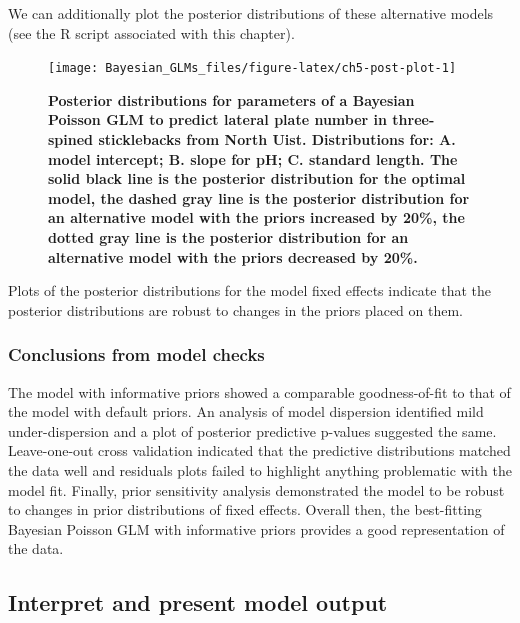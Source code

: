 \documentclass[
]{book}
\begin{document}
We can additionally plot the posterior distributions of these alternative models (see the R script associated with this chapter).



\begin{figure}

{\centering \texttt{[image: Bayesian\_GLMs\_files/figure-latex/ch5-post-plot-1]} 

}

\caption{\textbf{Posterior distributions for parameters of a Bayesian Poisson GLM to predict lateral plate number in three-spined sticklebacks from North Uist. Distributions for: A. model intercept; B. slope for pH; C. standard length. The solid black line is the posterior distribution for the optimal model, the dashed gray line is the posterior distribution for an alternative model with the priors increased by 20\%, the dotted gray line is the posterior distribution for an alternative model with the priors decreased by 20\%.}}\label{fig:ch5-post-plot}
\end{figure}

Plots of the posterior distributions for the model fixed effects indicate that the posterior distributions are robust to changes in the priors placed on them.

\hypertarget{conclusions-from-model-checks-1}{%
\subsubsection{Conclusions from model checks}\label{conclusions-from-model-checks-1}}

The model with informative priors showed a comparable goodness-of-fit to that of the model with default priors. An analysis of model dispersion identified mild under-dispersion and a plot of posterior predictive p-values suggested the same. Leave-one-out cross validation indicated that the predictive distributions matched the data well and residuals plots failed to highlight anything problematic with the model fit. Finally, prior sensitivity analysis demonstrated the model to be robust to changes in prior distributions of fixed effects. Overall then, the best-fitting Bayesian Poisson GLM with informative priors provides a good representation of the data.

\hypertarget{pois-present}{%
\subsection{Interpret and present model output}\label{pois-present}}
\end{document}
